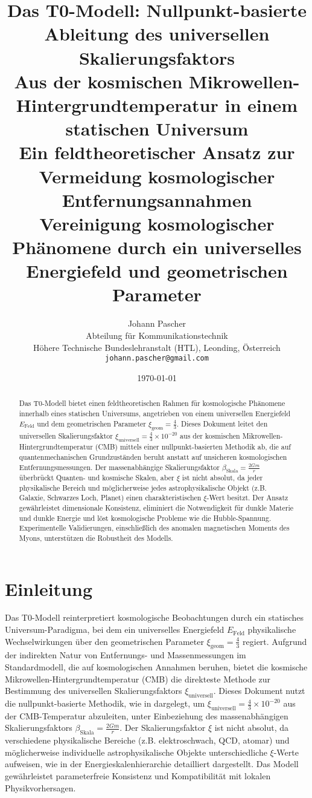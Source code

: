 \documentclass[12pt,a4paper]{report}
\title{
	{\Huge Das T0-Modell: Nullpunkt-basierte Ableitung des universellen Skalierungsfaktors}\\
	{\LARGE Aus der kosmischen Mikrowellen-Hintergrundtemperatur in einem statischen Universum}\\
	{\Large Ein feldtheoretischer Ansatz zur Vermeidung kosmologischer Entfernungsannahmen}\\
	\vspace{1cm}
	{\large Vereinigung kosmologischer Phänomene durch ein universelles Energiefeld und geometrischen Parameter}
}
\author{
	{\Large Johann Pascher}\\
	Abteilung für Kommunikationstechnik\\
	Höhere Technische Bundeslehranstalt (HTL), Leonding, Österreich\\
	\texttt{johann.pascher@gmail.com}
}
\date{\today}
\newcommand{\Efield}{E_{\text{Feld}}}
\newcommand{\xipar}{\xi}
\newcommand{\xiuniversal}{\xi_{\text{universell}}}
\newcommand{\xigeom}{\xi_{\text{geom}}}
\newcommand{\betascale}{\beta_{\text{Skala}}}
\theoremstyle{definition}
\begin{document}
	
	\maketitle
	
	\begin{abstract}
		Das T0-Modell bietet einen feldtheoretischen Rahmen für kosmologische Phänomene innerhalb eines statischen Universums, angetrieben von einem universellen Energiefeld $\Efield$ und dem geometrischen Parameter $\xigeom = \frac{4}{3}$. Dieses Dokument leitet den universellen Skalierungsfaktor $\xiuniversal = \frac{4}{3} \times 10^{-20}$ aus der kosmischen Mikrowellen-Hintergrundtemperatur (CMB) mittels einer nullpunkt-basierten Methodik ab, die auf quantenmechanischen Grundzuständen beruht anstatt auf unsicheren kosmologischen Entfernungsmessungen. Der massenabhängige Skalierungsfaktor $\betascale = \frac{2Gm}{r}$ überbrückt Quanten- und kosmische Skalen, aber $\xipar$ ist nicht absolut, da jeder physikalische Bereich und möglicherweise jedes astrophysikalische Objekt (z.B. Galaxie, Schwarzes Loch, Planet) einen charakteristischen $\xipar$-Wert besitzt. Der Ansatz gewährleistet dimensionale Konsistenz, eliminiert die Notwendigkeit für dunkle Materie und dunkle Energie und löst kosmologische Probleme wie die Hubble-Spannung. Experimentelle Validierungen, einschließlich des anomalen magnetischen Moments des Myons, unterstützen die Robustheit des Modells.
	\end{abstract}
	
	\tableofcontents
	
	\chapter{Einleitung}
	\label{chap:einleitung}
	
	Das T0-Modell reinterpretiert kosmologische Beobachtungen durch ein statisches Universum-Paradigma, bei dem ein universelles Energiefeld $\Efield$ physikalische Wechselwirkungen über den geometrischen Parameter $\xigeom = \frac{4}{3}$ regiert. Aufgrund der indirekten Natur von Entfernungs- und Massenmessungen im Standardmodell, die auf kosmologischen Annahmen beruhen, bietet die kosmische Mikrowellen-Hintergrundtemperatur (CMB) die direkteste Methode zur Bestimmung des universellen Skalierungsfaktors $\xiuniversal$. Dieses Dokument nutzt die nullpunkt-basierte Methodik, wie in \cite{pascher_derivation_beta_2025} dargelegt, um $\xiuniversal = \frac{4}{3} \times 10^{-20}$ aus der CMB-Temperatur abzuleiten, unter Einbeziehung des massenabhängigen Skalierungsfaktors $\betascale = \frac{2Gm}{r}$. Der Skalierungsfaktor $\xipar$ ist nicht absolut, da verschiedene physikalische Bereiche (z.B. elektroschwach, QCD, atomar) und möglicherweise individuelle astrophysikalische Objekte unterschiedliche $\xipar$-Werte aufweisen, wie in der Energieskalenhierarchie detailliert dargestellt. Das Modell gewährleistet parameterfreie Konsistenz und Kompatibilität mit lokalen Physikvorhersagen.
	
\end{document}
